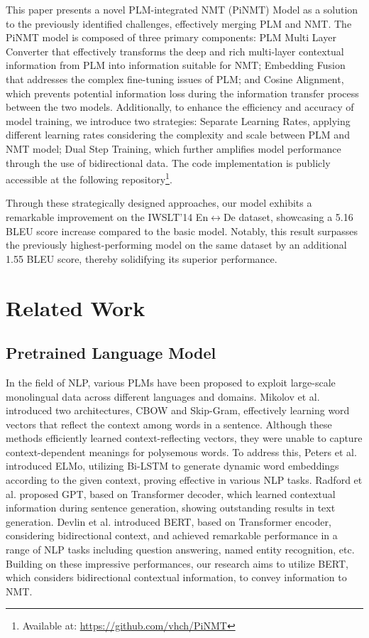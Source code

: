 \documentclass[conference]{IEEEtran}
\begin{document}
This paper presents a novel PLM-integrated NMT (PiNMT) Model as a solution to the previously identified challenges, effectively merging PLM and NMT. The PiNMT model is composed of three primary components: PLM Multi Layer Converter that effectively transforms the deep and rich multi-layer contextual information from PLM into information suitable for NMT; Embedding Fusion that addresses the complex fine-tuning issues of PLM; and Cosine Alignment, which prevents potential information loss during the information transfer process between the two models. 
Additionally, to enhance the efficiency and accuracy of model training, we introduce two strategies: Separate Learning Rates, applying different learning rates considering the complexity and scale between PLM and NMT model; Dual Step Training, which further amplifies model performance through the use of bidirectional data. The code implementation is publicly accessible at the following repository\footnote{Available at: \url{https://github.com/vhch/PiNMT}}.

Through these strategically designed approaches, our model exhibits a remarkable improvement on the IWSLT'14 En$\leftrightarrow$De dataset, showcasing a 5.16 BLEU score increase compared to the basic model. Notably, this result surpasses the previously highest-performing model on the same dataset by an additional 1.55 BLEU score, thereby solidifying its superior performance.












\section{Related Work}
\subsection{Pretrained Language Model}
In the field of NLP, various PLMs have been proposed to exploit large-scale monolingual data across different languages and domains. Mikolov et al. \cite{Mikolov2013} introduced two architectures, CBOW and Skip-Gram, effectively learning word vectors that reflect the context among words in a sentence. Although these methods efficiently learned context-reflecting vectors, they were unable to capture context-dependent meanings for polysemous words. To address this, Peters et al. \cite{peters2018elmo} introduced ELMo, utilizing Bi-LSTM to generate dynamic word embeddings according to the given context, proving effective in various NLP tasks. Radford et al. \cite{radford2018gpt} proposed GPT, based on Transformer decoder, which learned contextual information during sentence generation, showing outstanding results in text generation. Devlin et al. \cite{devlin2019bert} introduced BERT, based on Transformer encoder, considering bidirectional context, and achieved remarkable performance in a range of NLP tasks including question answering, named entity recognition, etc. Building on these impressive performances, our research aims to utilize BERT, which considers bidirectional contextual information, to convey information to NMT.
\end{document}

